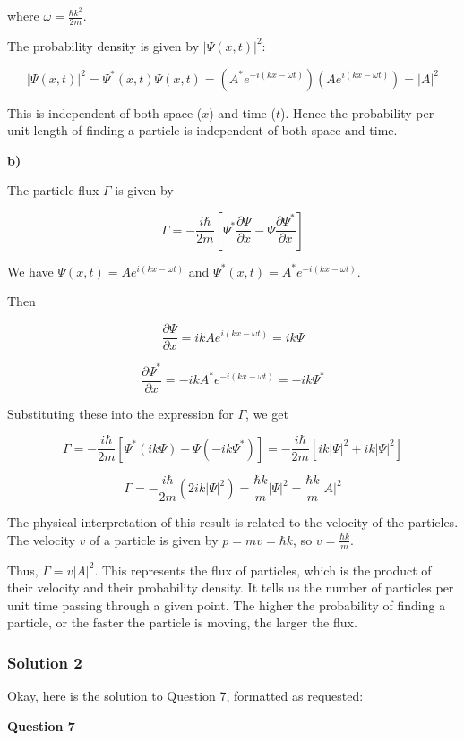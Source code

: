 \documentclass{article}
\begin{document}
where $\omega = \frac{\hbar k^2}{2m}$.

The probability density is given by $|\Psi(x,t)|^2$:

\[
|\Psi(x,t)|^2 = \Psi^*(x,t) \Psi(x,t) = (A^* e^{-i(kx - \omega t)}) (A e^{i(kx - \omega t)}) = |A|^2
\]

This is independent of both space ($x$) and time ($t$). Hence the probability per unit length of finding a particle is independent of both space and time.

\textbf{b)}

The particle flux $\Gamma$ is given by

\[
\Gamma = -\frac{i \hbar}{2m} \left[ \Psi^* \frac{\partial \Psi}{\partial x} - \Psi \frac{\partial \Psi^*}{\partial x} \right]
\]

We have $\Psi(x,t) = A e^{i(kx - \omega t)}$ and $\Psi^*(x,t) = A^* e^{-i(kx - \omega t)}$.

Then

\[
\frac{\partial \Psi}{\partial x} = ik A e^{i(kx - \omega t)} = ik \Psi
\]

\[
\frac{\partial \Psi^*}{\partial x} = -ik A^* e^{-i(kx - \omega t)} = -ik \Psi^*
\]

Substituting these into the expression for $\Gamma$, we get

\[
\Gamma = -\frac{i \hbar}{2m} \left[ \Psi^* (ik \Psi) - \Psi (-ik \Psi^*) \right] = -\frac{i \hbar}{2m} \left[ ik |\Psi|^2 + ik |\Psi|^2 \right]
\]

\[
\Gamma = -\frac{i \hbar}{2m} (2ik |\Psi|^2) = \frac{\hbar k}{m} |\Psi|^2 = \frac{\hbar k}{m} |A|^2
\]

The physical interpretation of this result is related to the velocity of the particles. The velocity $v$ of a particle is given by $p = mv = \hbar k$, so $v = \frac{\hbar k}{m}$.

Thus, $\Gamma = v |A|^2$. This represents the flux of particles, which is the product of their velocity and their probability density. It tells us the number of particles per unit time passing through a given point.  The higher the probability of finding a particle, or the faster the particle is moving, the larger the flux.


\subsubsection{Solution 2}
Okay, here is the solution to Question 7, formatted as requested:

\textbf{Question 7}
\end{document}
